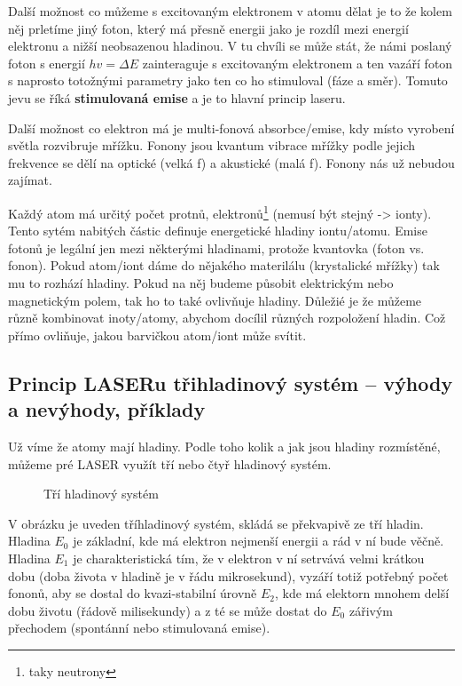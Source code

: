 \documentclass[a4paper, 12pt]{article}
\begin{document}
            Další možnost co můžeme s excitovaným elektronem v atomu dělat je to že kolem něj prletíme jiný foton,
            který má přesně energii jako je rozdíl mezi energií elektronu a nižší neobsazenou hladinou. V tu chvíli
            se může stát, že námi poslaný foton s energií $hv=\Delta E$ zainteraguje s excitovaným elektronem a ten
            vazáří foton s naprosto totožnými parametry jako ten co ho stimuloval (fáze a směr). Tomuto jevu
            se říká \textbf{stimulovaná emise} a je to hlavní princip laseru.

            Další možnost co elektron má je multi-fonová absorbce/emise, kdy místo vyrobení světla rozvibruje mřížku.
            Fonony jsou kvantum vibrace mřížky podle jejich frekvence se dělí na optické (velká f) a akustické (malá f).
            Fonony nás už nebudou zajímat.

            Každý atom má určitý počet protnů, elektronů\footnote{taky neutrony} (nemusí být stejný -> ionty).
            Tento sytém nabitých částic definuje energetické hladiny iontu/atomu.
            Emise fotonů je legální jen mezi některými hladinami, protože kvantovka (foton vs. fonon).
            Pokud atom/iont dáme do nějakého materilálu (krystalické mřížky) tak mu to rozhází hladiny.
            Pokud na něj budeme působit elektrickým nebo magnetickým polem, tak ho to také ovlivňuje hladiny.
            Důležié je že můžeme různě kombinovat inoty/atomy, abychom docílil různých rozpoložení hladin.
            Což přímo ovliňuje, jakou barvičkou atom/iont může svítit.

        \subsection{Princip LASERu třihladinový systém – výhody a nevýhody, příklady}
            Už víme že atomy mají hladiny. Podle toho kolik a jak jsou hladiny rozmístěné,
            můžeme pré LASER využít tří nebo čtyř hladinový systém.

            \begin{figure}[H]
                \centering
                
                \caption{Tří hladinový systém}
            \end{figure}

            V obrázku je uveden tříhladinový systém, skládá se překvapivě ze tří hladin. Hladina $E_0$ je základní,
            kde má elektron nejmenší energii a rád v ní bude věčně. Hladina $E_1$ je charakteristická tím,
            že v elektron v ní setrvává velmi krátkou dobu (doba života v hladině je v řádu mikrosekund), vyzáří totiž
            potřebný počet fononů, aby se dostal do kvazi-stabilní úrovně $E_2$, kde má elektorn mnohem delší
            dobu životu (řádově milisekundy) a z té se může dostat do $E_0$ zářivým přechodem (spontánní nebo stimulovaná emise).
            
\end{document}
